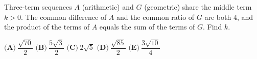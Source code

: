 Three-term sequences $A$ (arithmetic) and $G$ (geometric) share the middle term $k>0$. The common difference of $A$ and the common ratio of $G$ are both $4$, and the product of the terms of $A$ equals the sum of the terms of $G$. Find $k$.

$\textbf{(A)}\ \dfrac{\sqrt{70}}2$ \qquad $\textbf{(B)}\ \dfrac{5\sqrt3}2$ \qquad $\textbf{(C)}\ 2\sqrt5$ \qquad $\textbf{(D)}\ \dfrac{\sqrt{85}}2$ \qquad $\textbf{(E)}\ \dfrac{3\sqrt{10}}4$
